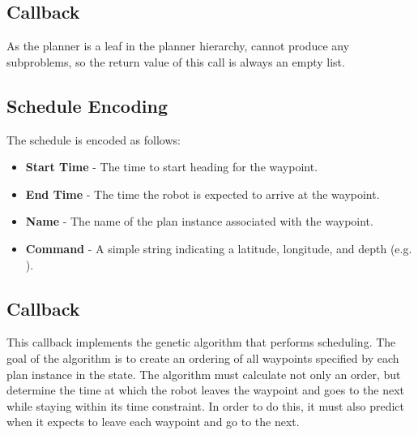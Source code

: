 \subsection{Callback }
As the  planner is a leaf in the planner hierarchy, cannot produce any subproblems, so the return value of this call is always an empty list.

\subsection{Schedule Encoding}
The schedule is encoded as follows:
\begin{itemize}
\item \textbf{Start Time} - The time to start heading for the waypoint.
\item \textbf{End Time} - The time the robot is expected to arrive at the waypoint.
\item \textbf{Name} - The name of the plan instance associated with the waypoint.
\item \textbf{Command} - A simple string indicating a latitude, longitude, and depth (e.g. ).
\end{itemize}

\subsection{Callback }
This callback implements the genetic algorithm that performs scheduling. The goal of the algorithm is to create an ordering of all waypoints specified by each plan instance in the  state. The algorithm must calculate not only an order, but determine the time at which the robot leaves the waypoint and goes to the next while staying within its time constraint. In order to do this, it must also predict when it expects to leave each waypoint and go to the next. 

